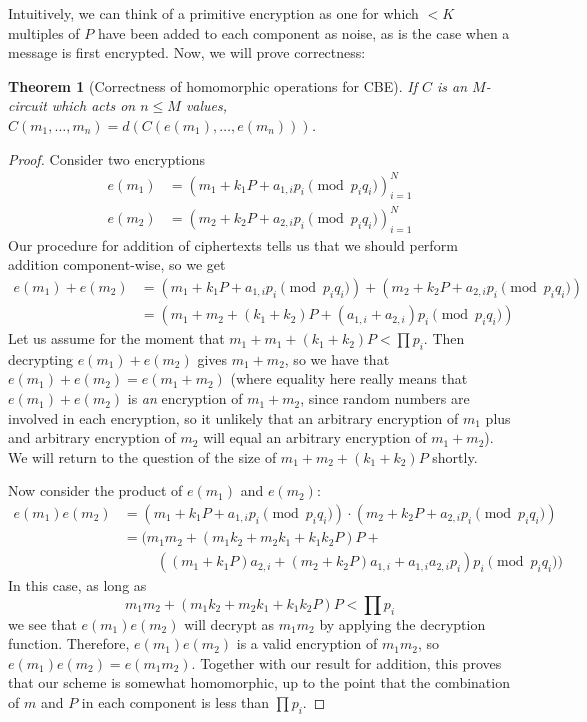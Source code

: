 \documentclass[11pt]{report}
\newtheorem{thm}{Theorem}
\begin{document}
Intuitively, we can think of a primitive encryption as one for which $<K$ multiples of $P$ have been added to each component as noise, as is the case when a message is first encrypted. Now, we will prove correctness:

\begin{thm}[Correctness of homomorphic operations for CBE]
If $C$ is an $M$-circuit which acts on $n\leq M$ values, $C(m_1,\dots,m_n) = d(C(e(m_1),\dots,e(m_n)))$.
\end{thm}

\begin{proof}
Consider two encryptions
\begin{align*}
e(m_1) &= (m_1+ k_1P+a_{1,i}p_i \pmod{p_iq_i})_{i=1}^N\\
e(m_2) &= (m_2+ k_2P+a_{2,i}p_i \pmod{p_iq_i})_{i=1}^N
\end{align*}
Our procedure for addition of ciphertexts tells us that we should perform addition component-wise, so we get
\begin{align*}
e(m_1)+e(m_2) &= (m_1+k_1P+a_{1,i}p_i \pmod{p_iq_i}) + (m_2+ k_2P+a_{2,i}p_i \pmod{p_iq_i}) \\
\ &= (m_1+m_2+ (k_1+k_2)P+(a_{1,i}+a_{2,i})p_i \pmod{p_iq_i})
\end{align*}
Let us assume for the moment that $m_1+m_1+(k_1+k_2)P < \prod p_i$. Then decrypting $e(m_1)+e(m_2)$ gives $m_1+m_2$, so we have that $e(m_1)+e(m_2) = e(m_1+m_2)$ (where equality here really means that $e(m_1)+e(m_2)$ is \emph{an} encryption of $m_1+m_2$, since random numbers are involved in each encryption, so it unlikely that an arbitrary encryption of $m_1$ plus and arbitrary encryption of $m_2$ will equal an arbitrary encryption of $m_1+m_2$). We will return to the question of the size of $m_1+m_2+(k_1+k_2)P$ shortly.

Now consider the product of $e(m_1)$ and $e(m_2)$:
\begin{align*}
e(m_1) e(m_2) &= (m_1+ k_1P+a_{1,i}p_i \pmod{p_iq_i}) \cdot (m_2+ k_2P+a_{2,i}p_i \pmod{p_iq_i}) \\
\ &= (m_1m_2+ (m_1k_2+m_2k_1+k_1k_2P)P+\\
& \ \ \ \ \ \ \ \ \ \ \ ((m_1+k_1P)a_{2,i}+(m_2+k_2P)a_{1,i}+a_{1,i}a_{2,i}p_i)p_i \pmod{p_iq_i})
\end{align*}
In this case, as long as
\[m_1m_2+ (m_1k_2+m_2k_1+k_1k_2P)P < \prod p_i\]
we see that $e(m_1)e(m_2)$ will decrypt as $m_1m_2$ by applying the decryption function. Therefore, $e(m_1)e(m_2)$ is a valid encryption of $m_1m_2$, so $e(m_1)e(m_2) = e(m_1m_2)$. Together with our result for addition, this proves that our scheme is somewhat homomorphic, up to the point that the combination of $m$ and $P$ in each component is less than $\prod p_i$.


\end{proof}
\end{document}
